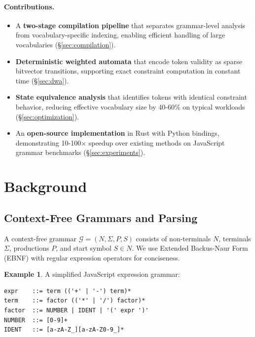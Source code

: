 \documentclass[11pt,a4paper]{article}
\newcommand{\grammar}{\mathcal{G}}
\theoremstyle{plain}
\theoremstyle{definition}
\newtheorem{example}[theorem]{Example}
\theoremstyle{remark}
\begin{document}
\paragraph{Contributions.}
\begin{itemize}[leftmargin=*]
\item A \textbf{two-stage compilation pipeline} that separates grammar-level analysis from vocabulary-specific indexing, enabling efficient handling of large vocabularies (\S\ref{sec:compilation}).

\item \textbf{Deterministic weighted automata} that encode token validity as sparse bitvector transitions, supporting exact constraint computation in constant time (\S\ref{sec:dwa}).

\item \textbf{State equivalence analysis} that identifies tokens with identical constraint behavior, reducing effective vocabulary size by 40-60\% on typical workloads (\S\ref{sec:optimization}).

\item An \textbf{open-source implementation} in Rust with Python bindings, demonstrating 10-100$\times$ speedup over existing methods on JavaScript grammar benchmarks (\S\ref{sec:experiments}).
\end{itemize}

\section{Background}
\label{sec:background}

\subsection{Context-Free Grammars and Parsing}

A context-free grammar $\grammar = (N, \Sigma, P, S)$ consists of non-terminals $N$, terminals $\Sigma$, productions $P$, and start symbol $S \in N$. We use Extended Backus-Naur Form (EBNF) with regular expression operators for conciseness.

\begin{example}
A simplified JavaScript expression grammar:
\begin{verbatim}
expr    ::= term (('+' | '-') term)*
term    ::= factor (('*' | '/') factor)*
factor  ::= NUMBER | IDENT | '(' expr ')'
NUMBER  ::= [0-9]+
IDENT   ::= [a-zA-Z_][a-zA-Z0-9_]*
\end{verbatim}
\end{example}
\end{document}
